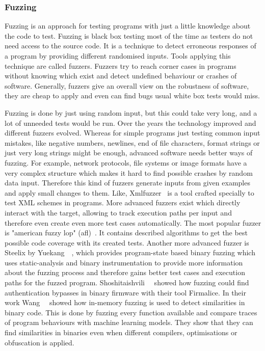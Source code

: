 \subsubsection{Fuzzing}

Fuzzing is an approach for testing programs with just a little knowledge about
the code to test. Fuzzing is black box testing most of the time as testers do
not need access to the source code. It is a technique to detect erroneous
responses of a program by providing different randomised inputs. Tools applying
this technique are called fuzzers. Fuzzers try to reach corner cases in programs
without knowing which exist and detect undefined behaviour or crashes of
software. Generally, fuzzers give an overall view on the robustness of software,
they are cheap to apply and even can find bugs usual white box tests would miss.

Fuzzing is done by just using random input, but this could take very long, and a
lot of unneeded tests would be run. Over the years the technology improved and
different fuzzers evolved. Whereas for simple programs just testing common input
mistakes, like negative numbers, newlines, end of file characters, format
strings or just very long strings might be enough, advanced software needs
better ways of fuzzing. For example, network protocols, file systems or image
formats have a very complex structure which makes it hard to find possible
crashes by random data input. Therefore this kind of fuzzers generate inputs
from given examples and apply small changes to them. Like,
Xmlfuzzer~\cite{xmlfuzzer} is a tool crafted specially to test XML schemes in
programs. More advanced fuzzers exist which directly interact with the target,
allowing to track execution paths per input and therefore even create even more
test cases automatically. The most popular fuzzer is "american fuzzy lop"
(afl)~\cite{aflweb}. It contains described algorithms to get the best possible
code coverage with its created tests. Another more advanced fuzzer is Steelix by
Yuekang~\etal~\cite{steelix}, which provides program-state based binary fuzzing
which uses static-analysis and binary instrumentation to provide more
information about the fuzzing process and therefore gains better test cases and
execution paths for the fuzzed program. Shoshitaishvili~\etal~\cite{firmalice}
showed how fuzzing could find authentication bypasses in binary firmware with
their tool Firmalice. In their work Wang~\etal~\cite{inmemfuzzing} showed how
in-memory fuzzing is used to detect similarities in binary code. This is done by
fuzzing every function available and compare traces of program behaviours with
machine learning models. They show that they can find similarities in binaries
even when different compilers, optimisations or obfuscation is applied.

